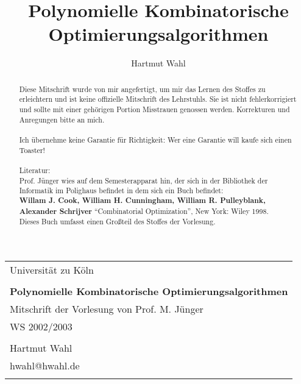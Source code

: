 \documentclass[12pt,titlepage,a4paper] {report}
\title{Polynomielle Kombinatorische Optimierungsalgorithmen}
\author{Hartmut Wahl}
\begin{document}
\begin{titlepage}
\begin{singlespacing}
\begin{tabular}{l}
{\Large Universität zu Köln}\\

\vspace{9cm}\\


{\bf \large Polynomielle Kombinatorische Optimierungsalgorithmen }\\
Mitschrift der Vorlesung von Prof. M. Jünger\\
WS 2002/2003
\\
\vspace{9cm}
\\
Hartmut Wahl\\
hwahl@hwahl.de\\
\vspace{7mm}\\

\end{tabular}
\end{singlespacing}
\end{titlepage}


\begin{abstract}
Diese Mitschrift wurde von mir angefertigt, um mir das Lernen des Stoffes zu
erleichtern und ist keine offizielle Mitschrift des Lehrstuhls. Sie ist
nicht fehlerkorrigiert und sollte mit einer gehörigen Portion Misstrauen
genossen werden. Korrekturen und Anregungen bitte an mich.\\
\\
Ich übernehme keine Garantie für Richtigkeit: Wer eine Garantie will kaufe
sich einen Toaster!\\
\\
Literatur:\\
Prof. Jünger wies auf dem Semesterapparat hin, der sich in der Bibliothek
der Informatik im Polighaus befindet in dem sich ein Buch befindet:\\
{\bf Willam J. Cook, William H. Cunningham, William R. Pulleyblank, 
Alexander Schrijver} "`Combinatorial Optimization"', New York: Wiley 1998.\\
Dieses Buch umfasst einen Großteil des Stoffes der Vorlesung.

\end{abstract}


\begin{onehalfspacing}
\tableofcontents
\end{onehalfspacing}
\pagebreak
{}
\end{document}

